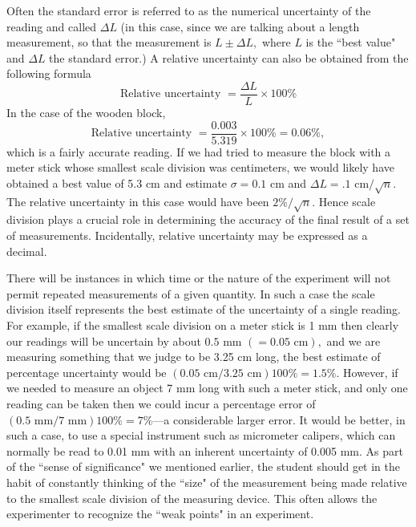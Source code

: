 \documentclass[main.tex]{subfiles}
\begin{document}
Often the standard error is referred to as the numerical uncertainty of the reading and called  $\Delta L$ (in this case, since we are talking about a length measurement, so that the measurement is $L \pm  \Delta L,$ where $L$ is the ``best value" and $\Delta L$ the standard error.)  A relative uncertainty can also be obtained from the following formula
\[
\text{Relative uncertainty } = \frac{\Delta L}{L}\times 100\%
\]
In the case of the wooden block,
\[
\text{Relative uncertainty } = \frac{0.003}{5.319}\times 100\% = 0.06\%,
\]
which is a fairly accurate reading. If we had tried to measure the block with a meter stick whose smallest scale division was centimeters, we would likely have obtained a best value of 5.3 cm and estimate $\sigma=0.1\text{ cm}$ and $\Delta L=.1\text{ cm}/\sqrt{n}.$ The relative uncertainty in this case would have been $2\%/\sqrt{n}.$  Hence scale division plays a crucial role in determining the accuracy of the final result of a set of measurements.  Incidentally, relative uncertainty may be expressed as a decimal.

There will be instances in which time or the nature of the experiment will not permit repeated measurements of a given quantity.  In such a case the scale division itself represents the best estimate of the uncertainty of a single reading.  For example, if the smallest scale division on a meter stick is 1 mm then clearly our readings will be uncertain by about $0.5\text{ mm } (= 0.05\text{ cm}),$ and we are measuring something that we judge to be 3.25 cm long, the best estimate of percentage uncertainty would be $(0.05\text{ cm}/3.25\text{ cm}) 100\% = 1.5\%.$  However, if we needed to measure an object 7 mm long with such a meter stick, and only one reading can be taken then we could incur a percentage error of $(0.5\text{ mm}/7\text{ mm})100\% = 7\%$---a considerable larger error.  It would be better, in such a  case, to use a special instrument such as micrometer calipers, which can normally be read to 0.01 mm with an inherent uncertainty of 0.005 mm.  As part of the ``sense of significance" we mentioned earlier, the student should get in the habit of constantly thinking of the ``size" of the measurement being made relative to the smallest scale division of the measuring device.  This often allows the experimenter to recognize the ``weak points" in an experiment.
\end{document}
